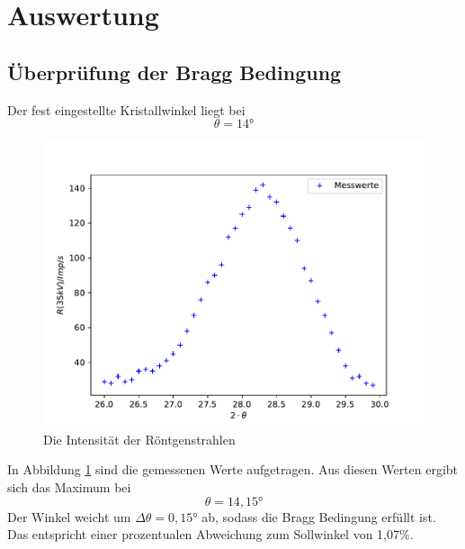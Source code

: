 

\section{Auswertung}
\subsection{Überprüfung der Bragg Bedingung}
Der fest eingestellte Kristallwinkel liegt bei
\begin{equation*}
  \theta = 14°
\end{equation*}
\begin{figure}
  \centering
  \includegraphics[width=\textwidth]{bragg.pdf}
  \caption{Die Intensität der Röntgenstrahlen}
  \label{fig:bragg}
\end{figure}
In Abbildung \ref{fig:bragg} sind die gemessenen Werte aufgetragen.
Aus diesen Werten ergibt sich das Maximum bei
\begin{equation}
  \theta = 14,15°
\end{equation}
Der Winkel weicht um $\Delta\theta = 0,15°$ ab,
sodass die Bragg Bedingung erfüllt ist.
Das entspricht einer prozentualen Abweichung zum Sollwinkel von 1,07\%.

